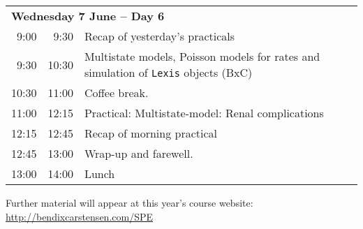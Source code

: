\noindent
\begin{tabular}{r@{ -- }rp{13cm}}
\multicolumn{3}{l}{\bf Wednesday 7 June -- Day 6} \\
 9:00 &  9:30 & Recap of yesterday's practicals \\
 9:30 & 10:30 & Multistate models, Poisson models for rates and
                simulation of \texttt{Lexis} objects (BxC)\\
10:30 & 11:00 & Coffee break. \\
11:00 & 12:15 & Practical: Multistate-model: Renal complications\\ %
12:15 & 12:45 & Recap of morning practical \\
12:45 & 13:00 & Wrap-up and farewell.\\
13:00 & 14:00 & Lunch \\
\end{tabular}
\vfill
\noindent
Further material will appear at this year's course website:\\ 
\url{http://bendixcarstensen.com/SPE}
